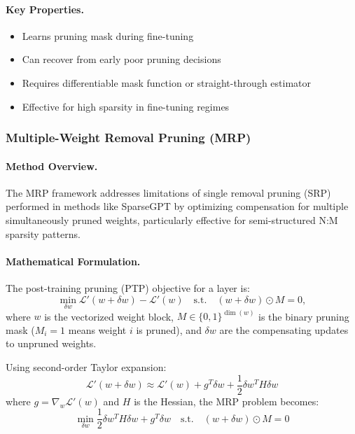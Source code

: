 \paragraph{Key Properties.}
\begin{itemize}[nosep]
	\item Learns pruning mask during fine-tuning
	\item Can recover from early poor pruning decisions
	\item Requires differentiable mask function or straight-through estimator
	\item Effective for high sparsity in fine-tuning regimes
\end{itemize}

\subsubsection{Multiple-Weight Removal Pruning (MRP)}

\paragraph{Method Overview.} The MRP framework \cite{zhao2024pruning} addresses limitations of single removal pruning (SRP) performed in methods like SparseGPT by optimizing compensation for multiple simultaneously pruned weights, particularly effective for semi-structured N:M sparsity patterns.

\paragraph{Mathematical Formulation.}
The post-training pruning (PTP) objective for a layer is:
\begin{equation}\label{eq:ptp}
	\min_{\delta w} \mathcal{L}'(w+\delta w) - \mathcal{L}'(w)
	\quad\text{s.t.}\quad (w+\delta w)\odot M = 0,
\end{equation}
where $w$ is the vectorized weight block, $M\in\{0,1\}^{\dim(w)}$ is the binary pruning mask ($M_i=1$ means weight $i$ is pruned), and $\delta w$ are the compensating updates to unpruned weights.

Using second-order Taylor expansion:
\begin{equation}
	\mathcal{L}'(w+\delta w) \approx \mathcal{L}'(w) + g^T \delta w + \frac{1}{2}\delta w^T H \delta w
\end{equation}
where $g = \nabla_w \mathcal{L}'(w)$ and $H$ is the Hessian, the MRP problem becomes:
\begin{equation}
	\min_{\delta w} \frac{1}{2}\delta w^T H \delta w + g^T \delta w \quad \text{s.t.} \quad (w+\delta w)\odot M = 0
\end{equation}

